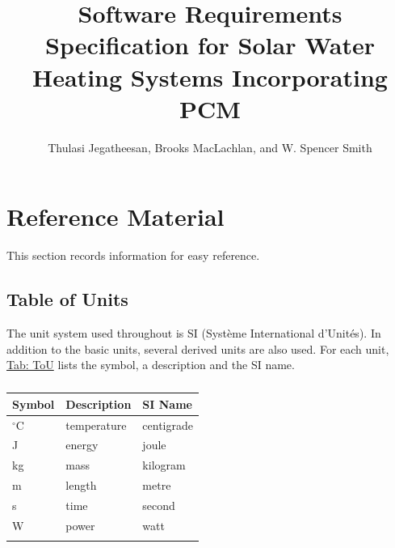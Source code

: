 \documentclass[12pt]{article}
\title{Software Requirements Specification for Solar Water Heating Systems Incorporating PCM}
\author{Thulasi Jegatheesan, Brooks MacLachlan, and W. Spencer Smith}
\begin{document}
\maketitle
\tableofcontents
\newpage
\section{Reference Material}
\label{Sec:RefMat}
This section records information for easy reference.
\subsection{Table of Units}
\label{Sec:ToU}
The unit system used throughout is SI (Système International d'Unités). In addition to the basic units, several derived units are also used. For each unit, \hyperref[Table:ToU]{Tab: ToU} lists the symbol, a description and the SI name.
\begin{longtable}{l l l}
\toprule
\textbf{Symbol} & \textbf{Description} & \textbf{SI Name}
\\
\midrule
\endhead
${}^{\circ}$C & temperature & centigrade
\\
J & energy & joule
\\
kg & mass & kilogram
\\
m & length & metre
\\
s & time & second
\\
W & power & watt
\\
\bottomrule
\caption{}
\label{Table:ToU}
\end{longtable}
\end{document}
